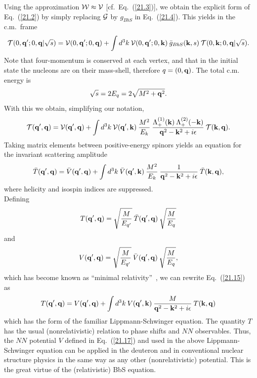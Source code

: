 Using the approximation ${\cal W}\approx {\cal V}$ [cf.\ Eq.~(\ref{21.3})], 
we obtain the explicit form of 
Eq.~(\ref{21.2}) by simply
replacing  ${\cal G}$ by $g_{BbS}$ in Eq.~(\ref{21.4}). This yields
in the c.m.~frame
\begin{equation}
{\cal T}(0,{\bf  q'};0,{\bf  q}|\sqrt{s})
 =  {\cal V}(0,{\bf  q'};0,{\bf  q}) + \int d^3k\: 
{\cal V}(0,{\bf  q'};0,{\bf  k})\: \bar{g}_{BbS}({\bf  k},s)\: 
{\cal T}(0,{\bf  k};0,{\bf  q}|\sqrt{s}) .
\label{21.12}
\end{equation} 
Note that four-momentum is conserved at each vertex,
and that in the initial state the nucleons are on their mass-shell,
therefore $q=(0,{\bf  q})$.
The total c.m. energy is
\begin{equation}
\sqrt{s}=2E_{q}=2\sqrt{M^2+{\bf  q}^2}.
\label{21.13}
\end{equation}
With this we obtain, simplifying our notation,
\begin{equation}
{\cal T}({\bf  q'},{\bf  q})={\cal V}({\bf  q'},{\bf  q})+
\int d^3k\:
{\cal V}({\bf  q'},{\bf  k})\:
\frac{M^{2}}{E_{k}}\:
\frac{\Lambda_{+}^{(1)}({\bf  k})\:
\Lambda_{+}^{(2)}({\bf  -k})}
{{\bf  q}^{2}-{\bf  k}^{2}+i\epsilon}\:
{\cal T}({\bf  k},{\bf  q}).
\label{21.14}
\end{equation}
Taking matrix elements between positive-energy spinors
 yields an equation for the invariant scattering amplitude
\begin{equation}
\bar{T}({\bf  q'},{\bf  q})=\bar{V}({\bf  q'},{\bf  q})+
\int d^3k\:
\bar{V}({\bf  q'},{\bf  k})\:
\frac{M^{2}}{E_{k}}\:
\frac{1}
{{\bf  q}^{2}-{\bf  k}^{2}+i\epsilon}\:
\bar{T}({\bf  k},{\bf  q}),
\label{21.15}
\end{equation}
where helicity and isospin indices are suppressed.
\\
Defining
\begin{equation}
{T}({\bf  q'}, {\bf  q})
 = \sqrt{\frac{M}{E_{q'}}}\: \bar{T}({\bf  q'}, {\bf  q})\:
 \sqrt{\frac{M}{E_{q}}}
\label{21.16}
\end{equation}
and
\begin{equation} 
{V}({\bf  q'},{\bf  q})
 = \sqrt{\frac{M}{E_{q'}}}\:  \bar{V}({\bf  q'},{\bf  q})\:
 \sqrt{\frac{M}{E_{q}}},
\label{21.17}
\end{equation}
which has become known as ``minimal relativity''~\cite{BJK69},
we can rewrite Eq.~(\ref{21.15}) as
\begin{equation}
 {T}({\bf  q'},{\bf  q})= {V}({\bf  q'},{\bf  q})+
\int d^3k\:
{V}({\bf  q'},{\bf  k})\:
\frac{M}
{{\bf  q}^{2}-{\bf  k}^{2}+i\epsilon}\:
{T}({\bf  k},{\bf  q})
\label{21.18}
\end{equation}
which has the form of the familiar Lippmann-Schwinger equation.
The quantity $T$ has the usual (nonrelativistic) relation to
phase shifts and $NN$ observables. 
Thus, the $NN$ potential $V$
defined in Eq.~(\ref{21.17}) and used in the above Lippmann-Schwinger
equation can be applied 
in the deuteron and in conventional nuclear structure physics
in the same way as any other (nonrelativistic) potential. 
This is the great virtue of the (relativistic) BbS equation.



